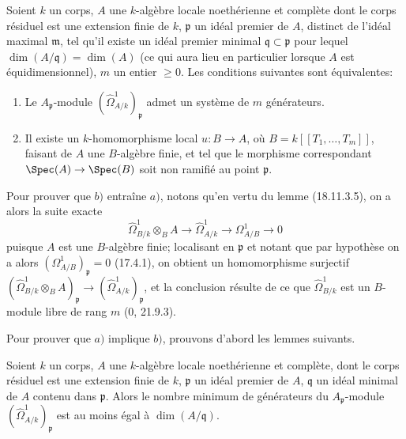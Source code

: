 \begin{proposition}[18.11.5]
\label{IV.18.11.5}
Soient $k$ un corps, $A$ une $k$-algèbre locale noethérienne et complète dont le corps résiduel est une extension finie de $k$, $\mathfrak p$ un idéal premier de $A$, distinct de l'idéal maximal $\mathfrak m$, tel qu'il existe un idéal premier minimal $\mathfrak q\subset\mathfrak p$ pour lequel $\dim(A/\mathfrak q)=\dim(A)$ (ce qui aura lieu en particulier lorsque $A$ est équidimensionnel), $m$ un entier $\geq0$. Les conditions suivantes sont équivalentes:
\begin{enumerate}
  \item[$a)$] Le $A_{\mathfrak p}$-module $(\hat{\Omega}^1_{A/k})_{\mathfrak p}$ admet un système de $m$ générateurs.
  \item[$b)$] Il existe un $k$-homomorphisme local $u:B\to A$, où $B=k[[T_1,\ldots,T_m]]$, faisant de $A$ une $B$-algèbre finie, et tel que le morphisme correspondant $\Spec(A)\to\Spec(B)$ soit non ramifié au point $\mathfrak p$.
\end{enumerate}
\end{proposition}

Pour prouver que $b)$ entraîne $a)$, notons qu'en vertu du lemme (18.11.3.5), on a alors la suite exacte
\[
  \hat{\Omega}^1_{B/k}\otimes_B A\longrightarrow\hat{\Omega}^1_{A/k}\longrightarrow\Omega^1_{A/B}\longrightarrow0
\]
puisque $A$ est une $B$-algèbre finie; localisant en $\mathfrak p$ et notant que par hypothèse on a alors $(\Omega^1_{A/B})_{\mathfrak p}=0$ (17.4.1), on obtient un homomorphisme surjectif $(\hat{\Omega}^1_{B/k}\otimes_B A)_{\mathfrak p}\to(\hat{\Omega}^1_{A/k})_{\mathfrak p}$, et la conclusion résulte de ce que $\hat{\Omega}^1_{B/k}$ est un $B$-module libre de rang $m$ (0, 21.9.3).

Pour prouver que $a)$ implique $b)$, prouvons d'abord les lemmes suivants.

\begin{lemma}[18.11.5.1]
\label{IV.18.11.5.1}
Soient $k$ un corps, $A$ une $k$-algèbre locale noethérienne et complète, dont le corps résiduel est une extension finie de $k$, $\mathfrak p$ un idéal premier de $A$, $\mathfrak q$ un idéal minimal de $A$ contenu dans $\mathfrak p$. Alors le nombre minimum de générateurs du $A_{\mathfrak p}$-module $(\hat{\Omega}^1_{A/k})_{\mathfrak p}$ est au moins égal à $\dim(A/\mathfrak q)$.
\end{lemma}


